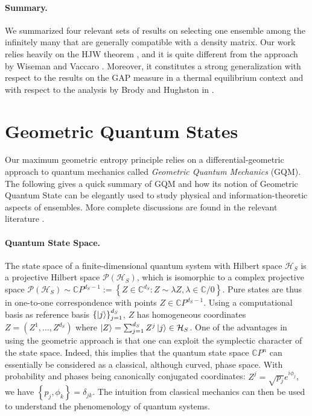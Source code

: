 \documentclass[draft,nofootinbib,pre,twocolumn,showpacs,showkeys,groupaddress,preprintnumbers,floatfix]{revtex4-1}
\newcommand{\1}{\mathbbm{1}}
\newcommand{\CP}[1]{\mathbb{C}P^{#1}}
\begin{document}
\paragraph*{Summary.} We summarized four relevant sets of results on selecting
one ensemble among the infinitely many that are generally compatible with a
density matrix. Our work relies heavily on the HJW theorem \cite{HJW93}, and it
is quite different from the approach by Wiseman and Vaccaro \cite{Wise01}.
Moreover, it constitutes a strong generalization with respect to the results on
the GAP measure \cite{Gold06} in a thermal equilibrium context and with respect
to the analysis by Brody and Hughston in \cite{Brody2000}.

\section{Geometric Quantum States}
\label{sec:GQS}

Our maximum geometric entropy principle relies on a differential-geometric
approach to quantum mechanics called \emph{Geometric Quantum Mechanics} (GQM).
The following gives a quick summary of GQM and how its notion of Geometric
Quantum State \cite{Anza20a,Anza22,Anza22a} can be elegantly used to study
physical and information-theoretic aspects of ensembles. More complete
discussions are found in the relevant literature
\cite{STROCCHI1966,Kibble1979,Heslot1985,Gibbons1992,Ashtekar1995,Ashtekar1999,Brody2001,Bengtsson2017,Carinena2007,Chruscinski2006,Marmo2010,Avron2020,Pastorello2015,Pastorello2015a,Pastorello2016,Clemente-Gallardo2013}.

\paragraph*{Quantum State Space.} The state space of a finite-dimensional
quantum system with Hilbert space $\mathcal{H}_S$ is a projective Hilbert space
$\mathcal{P}(\mathcal{H}_S)$, which is isomorphic to a complex projective space
$\mathcal{P}(\mathcal{H}_S) \sim \mathbb{C}P^{d_S-1}:= \left\{ Z \in
\mathbb{C}^{d_S}: Z \sim \lambda Z, \lambda \in \mathbb{C}/{0}\right\}$.  Pure
states are thus in one-to-one correspondence with points $Z \in \CP{d_S-1}$.
Using a computational basis as reference basis
$\left\{\ket{j}\right\}_{j=1}^{d_S}$, $Z$ has homogeneous coordinates $Z =
(Z^1,\ldots,Z^{d_S})$ where $\ket{Z} = \sum_{j=1}^{d_S}Z^j \ket{j} \in
\mathcal{H}_S$. One of the advantages in using the geometric approach is that
one can exploit the symplectic character of the state space. Indeed, this
implies that the quantum state space $\CP{n}$ can essentially be considered as
a classical, although curved, phase space. With probability and phases being
canonically conjugated coordinates: $Z^j = \sqrt{p_j}e^{i\phi_j}$, we have
$\left\{ p_j,\phi_k\right\} = \delta_{jk}$. The intuition from classical
mechanics can then be used to understand the phenomenology of quantum systems.
\end{document}

